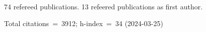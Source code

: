 74 refereed publications. 13 refeered publications as first author.

Total citations~=~3912; h-index~=~34 (2024-03-25)